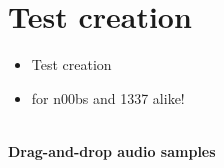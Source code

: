 
\section{Test creation} %

\begin{itemize}
	\item Test creation
	\item for n00bs and 1337 alike! 
\end{itemize}

\begin{center}
\\ %
\small
\textbf{Drag-and-drop audio samples}
\end{center}